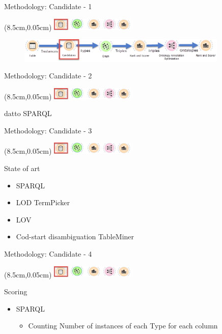 \documentclass{beamer}
\begin{document}
\begin{frame}{Methodology: Candidate - 1}
	\begin{textblock*}{4cm}(8.5cm,0.05cm) %
		\includegraphics[width=4cm]{images/header-candidate.png}
	\end{textblock*}
	\begin{figure}
		\includegraphics[width=10cm]{images/diagrams-candidate.png}
	\end{figure}
\end{frame}
\begin{frame}{Methodology: Candidate - 2}
	\begin{textblock*}{4cm}(8.5cm,0.05cm) %
		\includegraphics[width=4cm]{images/header-candidate.png}
	\end{textblock*}
	\begin{definition}
		datto SPARQL
	\end{definition}
\end{frame}
\begin{frame}{Methodology: Candidate - 3}
	\begin{textblock*}{4cm}(8.5cm,0.05cm) %
		\includegraphics[width=4cm]{images/header-candidate.png}
	\end{textblock*}
	State of art
	\begin{itemize}
		\item SPARQL
		\item LOD TermPicker
		\item LOV
		\item Cod-start disambiguation TableMiner
	\end{itemize}
\end{frame}
\begin{frame}{Methodology: Candidate - 4}
	\begin{textblock*}{4cm}(8.5cm,0.05cm) %
		\includegraphics[width=4cm]{images/header-candidate.png}
	\end{textblock*}
	Scoring
	\begin{itemize}
		\item SPARQL
		\begin{itemize}
			\item Counting Number of instances of each Type for each column
		\end{itemize}
	\end{itemize}
\end{frame}
\end{document}
